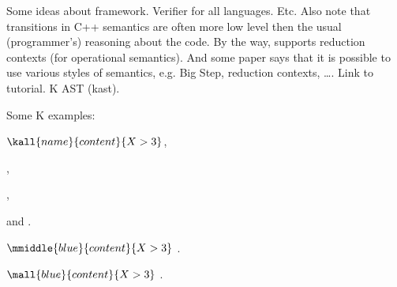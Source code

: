 \documentclass{fithesis3}
\begin{document}
Some ideas about \K framework. Verifier for all languages. Etc. Also note that transitions in C++ semantics are often more low level then the usual (programmer's) reasoning about the code. By the way, \K supports reduction contexts (for operational semantics). And some \K paper says that it is possible to use various styles of semantics, e.g. Big Step, reduction contexts, \ldots . Link to \K tutorial. K AST (kast).


\ifshowkexamples
Some K examples:

$\kall{name}{content}{X > 3}$,

,

,

and .

$\mmiddle{blue}{content}{X > 3}$
.

$\mall{blue}{content}{X > 3}$
.


\fi %

\fi %


 
\end{document}

